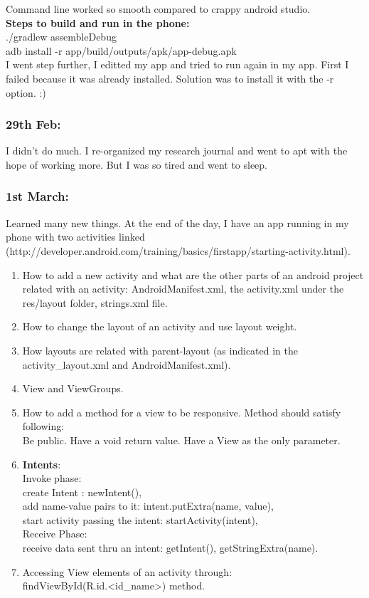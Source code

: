 \documentclass[11pt]{article}
\begin{document}
Command line worked so smooth compared to crappy android studio. \\

\textbf{Steps to build and run in the phone:}\\
./gradlew assembleDebug\\
adb install -r app/build/outputs/apk/app-debug.apk\\

I went step further, I editted my app and tried to run again in my app. First I failed because it was already installed. Solution was to install it 
with the -r option. :)

\subsubsection*{29th Feb:}
I didn't do much. I re-organized my research journal and went to apt with the hope of working more. But I was so tired and went to sleep.

\subsubsection*{1st March:}
Learned many new things. At the end of the day, I have an app running in my phone with two activities linked 
(http://developer.android.com/training/basics/firstapp/starting-activity.html).
\begin{enumerate}
 \item How to add a new activity and what are the other parts of an android project related with an activity: AndroidManifest.xml, the activity.xml 
under the res/layout folder, strings.xml file.
 \item How to change the layout of an activity and use layout weight. 
 \item How layouts are related with parent-layout (as indicated in the activity\_layout.xml and AndroidManifest.xml).
 \item View and ViewGroups.
 \item How to add a method for a view to be responsive. Method should satisfy following:\\
 Be public. Have a void return value. Have a View as the only parameter.
 \item \textbf{Intents}: \\
 Invoke phase:\\
 create Intent : newIntent(), \\
 add name-value pairs to it: intent.putExtra(name, value),\\
 start activity passing the intent: 
 startActivity(intent), \\
 
 Receive Phase:\\
 receive data sent thru an intent: getIntent(), getStringExtra(name). 
 \item Accessing View elements of an activity through:\\
 findViewById(R.id.<id\_name>)  method.
\end{enumerate}
\end{document}
